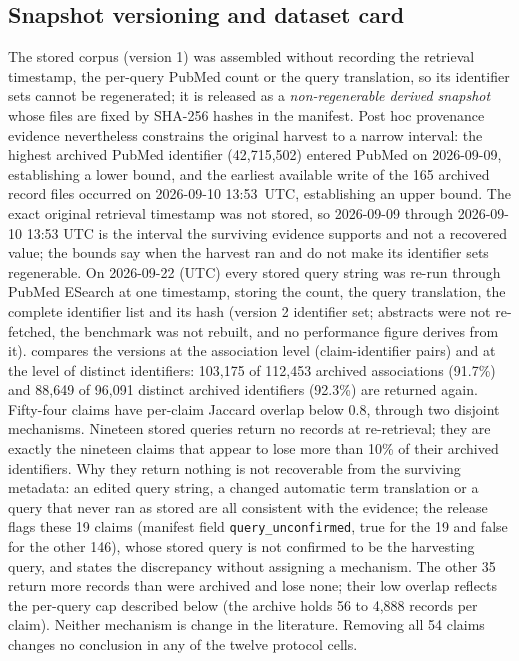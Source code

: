 \documentclass[11pt]{article}
\begin{document}
\subsection{Snapshot versioning and dataset card}
\label{app:snapshot}
The stored corpus (version 1) was assembled without recording the retrieval timestamp, the
per-query PubMed count or the query translation, so its identifier sets cannot be regenerated; it
is released as a \emph{non-regenerable derived snapshot} whose files are fixed by SHA-256 hashes in
the manifest. Post hoc provenance evidence nevertheless constrains the original harvest to a narrow
interval: the highest archived PubMed identifier (42{,}715{,}502) entered PubMed on 2026-09-09,
establishing a lower bound, and the earliest available write of the 165 archived record
files occurred on 2026-09-10 13:53~UTC, establishing an upper bound. The exact original retrieval
timestamp was not stored, so 2026-09-09 through 2026-09-10 13:53 UTC is the interval the surviving evidence supports and
not a recovered value; the bounds say when the harvest ran and do not make its identifier sets
regenerable. On 2026-09-22 (UTC) every stored query string was re-run through PubMed ESearch at
one timestamp, storing the count, the query translation, the complete identifier list and its hash
(version 2 identifier set; abstracts were not re-fetched, the benchmark was not rebuilt, and no performance figure derives from it).
 compares the versions at the association level (claim-identifier pairs) and
at the level of distinct identifiers: 103{,}175 of 112{,}453 archived associations (91.7\%) and
88{,}649 of 96{,}091 distinct archived identifiers (92.3\%) are returned again.
Fifty-four claims have per-claim Jaccard overlap below 0.8, through two disjoint mechanisms. Nineteen
stored queries return no records at re-retrieval; they are exactly the nineteen claims that appear
to lose more than 10\% of their archived identifiers. Why they return nothing is not recoverable from
the surviving metadata: an edited query string, a changed automatic term translation or a query that
never ran as stored are all consistent with the evidence; the release flags these 19 claims
(manifest field \texttt{query\_unconfirmed}, true for the 19 and false for the other 146), whose
stored query is not confirmed to be the harvesting query, and states the discrepancy without
assigning a mechanism.
The other 35 return more records than were archived and lose none; their low overlap reflects the per-query cap described below (the archive
holds 56 to 4{,}888 records per claim). Neither mechanism is
change in the literature. Removing all 54 claims changes no conclusion in any of the twelve protocol
cells.
\end{document}

